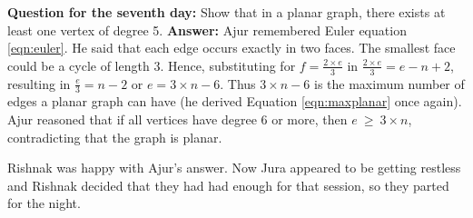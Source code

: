 \textbf{Question for the seventh day:} Show that in a planar graph, there exists at least one vertex of degree 5.
\textbf{Answer:} Ajur remembered Euler equation \ref{eqn:euler}. He said that each edge occurs exactly in two faces. The smallest face could be a cycle of length 3. Hence, substituting for $f=\frac{2 \times e}{3}$ in  
$\frac{2 \times e} {3} =e-n+2$, resulting in $\frac{e}{3}=n-2$ or $e=3\times n -6$. Thus $3 \times n-6$ is the maximum number of edges a planar graph can have (he derived Equation \ref{eqn:maxplanar} once again). Ajur reasoned that if all vertices have degree 6 or more, then $e~\ge~ 3 \times n$, contradicting that the graph is planar.

Rishnak was happy with Ajur's answer.
Now Jura appeared to be getting restless and Rishnak decided that they had had enough for that session, so they parted for the night.

